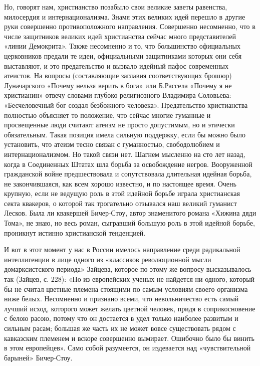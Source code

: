 Но, говорят нам, христианство  позабыло свои великие заветы равенства,
милосердия  и  интернационализма.  Знамя  этих  великих  идей  перешло
в  другие  руки  совершенно противоположного  направления.  Совершенно
несомненно, что  в числе  защитников великих идей  христианства сейчас
много  представителей «линии  Демокрита». Также  несомненно и  то, что
большинство  официальных  церковников  предали те  идеи,  официальными
защитниками  которых  они  себя  выставляют,  и  это  предательство  и
вызвало идейный  пафос современных атеистов. На  вопросы (составляющие
заглавия  соответствующих брошюр)  Луначарского «Почему  нельзя верить
в  бога»  или  Б.Рассела  «Почему  я  не  христианин»  отвечу  словами
глубоко  религиозного Владимира  Соловьева: «Бесчеловечный  бог создал
безбожного человека».  Предательство христианства  полностью объясняет
то положение, что  сейчас многие гуманные и  просвещенные люди считают
атеизм не просто допустимым, но и этически обязательным. Такая позиция
имела сильную  поддержку, если  бы можно  было установить,  что атеизм
тесно  связан с  гуманностью, свободолюбием  и интернационализмом.  Но
такой связи нет. Шагнем мысленно на сто лет назад, когда в Соединенных
Штатах  шла борьба  за  освобождение  негров. Вооруженной  гражданской
войне  предшествовала и  сопутствовала длительная  идейная борьба,  не
закончившаяся,  как  всем  хорошо  известно,  и  по  настоящее  время.
Очень  крупную, если  не ведущую  роль  в этой  идейной борьбе  играла
христианская  секта  квакеров,  о которой  так  трогательно  отзывался
наш  великий  гуманист Лесков.  Была  ли  квакершей Бичер-Стоу,  автор
знаменитого  романа  «Хижина  дяди  Тома», не  знаю,  но  весь  роман,
сыгравший  большую  роль  в  этой идейной  борьбе,  проникнут  истинно
христианской тенденцией.

И  вот  в  этот  момент  у нас  в  России  имелось  направление  среди
радикальной интеллигенции  в лице  одного из  «классиков революционной
мысли домарксистского  периода» Зайцева,  которое по этому  же вопросу
высказывалось  так (Зайцев,  с.  228): «Но  из  европейских ученых  не
найдется ни одного,  который бы не считал цветные  племена стоящими по
самым  условиям своего  организма  ниже белых.  Несомненно и  признано
всеми,  что невольничество  есть  самый лучший  исход, которого  может
желать цветной человек, придя в  соприкосновение с белою расою, потому
что  он достается  в удел  только наиболее  развитым и  сильным расам;
большая же  часть их  не может вовсе  существовать рядом  с кавказским
племенем и вскоре совершенно вымирает.  Ошибочно было бы винить в этом
европейцев». Само собой разумеется,  он издевается над «чувствительной
барыней» Бичер-Стоу.

